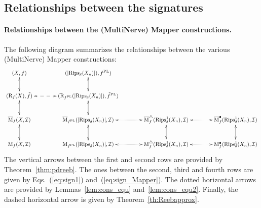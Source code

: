 \subsection{Relationships between the signatures}
\label{sec:approx-sigs}

\paragraph*{Relationships between the (MultiNerve) Mapper constructions.} 
The following diagram summarizes the relationships between the various
(MultiNerve) Mapper constructions:
%
\begin{equation}\label{eq:continuous-discrete}
\xymatrix@C=40pt{ (X, f) \ar@{<->}[d] & (|\Rips_\delta(X_n)|), \funcPL) \ar@{<->}[d] \\ 
(\Reeb_f(X), \tilde f) \ar@{<->}[d]
\ar@{<-->}[r] & (\Reeb_{\funcPL}(|\Rips_\delta(X_n)|), \tilde f^{\rm PL}) \ar@{<->}[d]
\\
\MMapper_f(X, \I) \ar@{<->}[d] & \MMapper_{\funcPL}(|\Rips_\delta(X_n)|, \I) \ar@{<->}[d] \ar@{<.>}[r] & 
\MMappere_{f}(\Rips^1_\delta(X_n), \I)\ar@{<.>}[r] \ar@{<->}[d] & 
\MMapperv_{f}(\Rips^1_\delta(X_n), \I) \ar@{<->}[d] \\
\Mapper_f(X, \I) & \Mapper_{\funcPL}(|\Rips_\delta(X_n)|, \I) \ar@{<.>}[r] & 
\Mappere_{f}(\Rips^1_\delta(X_n), \I)\ar@{<.>}[r] & 
\Mapperv_{f}(\Rips^1_\delta(X_n), \I) 
}
\end{equation}
%
The vertical arrows between the first and second rows are provided by
Theorem~\ref{thm:pdreeb}. The ones between the second, third and fourth rows
are given by Eqs.~(\ref{eq:sign1}) and~(\ref{eq:sign_Mapper}). The
dotted horizontal arrows are provided by Lemmas~\ref{lem:cons_equ}
and~\ref{lem:cons_equ2}. Finally, the dashed horizontal arrow is 
given by Theorem~\ref{th:Reebapprox}. 


